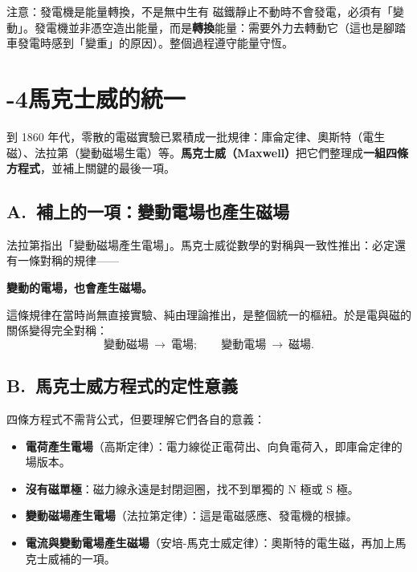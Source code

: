 \documentclass[11pt]{article}
\begin{document}
\begin{補充框}{注意：發電機是能量轉換，不是無中生有}
磁鐵靜止不動時不會發電，必須有「變動」。發電機並非憑空造出能量，而是\textbf{轉換}能量：需要外力去轉動它（這也是腳踏車發電時感到「變重」的原因）。整個過程遵守能量守恆。
\end{補充框}

\section*{-4\quad 馬克士威的統一}

到 1860 年代，零散的電磁實驗已累積成一批規律：庫侖定律、奧斯特（電生磁）、法拉第（變動磁場生電）等。\textbf{馬克士威（Maxwell）}把它們整理成\textbf{一組四條方程式}，並補上關鍵的最後一項。

\subsection*{\sffamily A.\ 補上的一項：變動電場也產生磁場}

法拉第指出「變動磁場產生電場」。馬克士威從數學的對稱與一致性推出：必定還有一條對稱的規律——

\begin{center}
\textbf{變動的電場，也會產生磁場。}
\end{center}

這條規律在當時尚無直接實驗、純由理論推出，是整個統一的樞紐。於是電與磁的關係變得完全對稱：
$$\text{變動磁場}\ \longrightarrow\ \text{電場};\qquad \text{變動電場}\ \longrightarrow\ \text{磁場}.$$

\subsection*{\sffamily B.\ 馬克士威方程式的定性意義}

四條方程式不需背公式，但要理解它們各自的意義：

\begin{itemize}\setlength{\itemsep}{2pt}
\item \textbf{電荷產生電場}（高斯定律）：電力線從正電荷出、向負電荷入，即庫侖定律的場版本。
\item \textbf{沒有磁單極}：磁力線永遠是封閉迴圈，找不到單獨的 N 極或 S 極。
\item \textbf{變動磁場產生電場}（法拉第定律）：這是電磁感應、發電機的根據。
\item \textbf{電流與變動電場產生磁場}（安培-馬克士威定律）：奧斯特的電生磁，再加上馬克士威補的一項。
\end{itemize}
\end{document}
